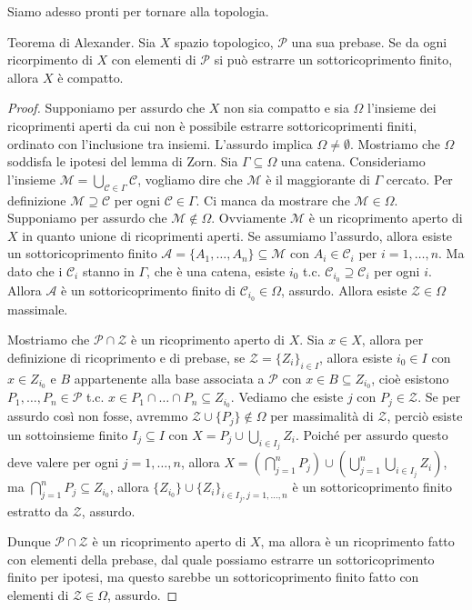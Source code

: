 Siamo adesso pronti per tornare alla topologia.

\begin{thm} \label{alexander}
  Teorema di Alexander. Sia $X$ spazio topologico, $\mathcal{P}$ una sua prebase. Se da ogni ricorpimento di $X$ con elementi di $\mathcal{P}$ si può estrarre un sottoricoprimento finito, allora $X$ è compatto.
\end{thm}

\begin{proof}
  Supponiamo per assurdo che $X$ non sia compatto e sia $\Omega$ l'insieme dei ricoprimenti aperti da cui non è possibile estrarre sottoricoprimenti finiti, ordinato con l'inclusione tra insiemi. L'assurdo implica $\Omega \not= \emptyset$. Mostriamo che $\Omega$ soddisfa le ipotesi del lemma di Zorn.
  Sia $\Gamma \subseteq \Omega$ una catena.
  Consideriamo l'insieme $\displaystyle \mathcal{M}=\bigcup_{\mathcal{C} \in \Gamma} \mathcal{C}$, vogliamo dire che $\mathcal{M}$ è il maggiorante di $\Gamma$ cercato. Per definizione $\mathcal{M} \supseteq \mathcal{C}$ per ogni $\mathcal{C} \in \Gamma$. Ci manca da mostrare che $\mathcal{M} \in \Omega$.
  Supponiamo per assurdo che $\mathcal{M} \not\in \Omega$. Ovviamente $\mathcal{M}$ è un ricoprimento aperto di $X$ in quanto unione di ricoprimenti aperti. Se assumiamo l'assurdo, allora esiste un sottoricoprimento finito $\mathcal{A}=\{A_1, \dots, A_n\} \subseteq \mathcal{M}$ con $A_i \in \mathcal{C}_i$ per $i=1, \dots, n$.
  Ma dato che i $\mathcal{C}_i$ stanno in $\Gamma$, che è una catena, esiste $i_0$ t.c. $\mathcal{C}_{i_0} \supseteq \mathcal{C}_i$ per ogni $i$. Allora $\mathcal{A}$ è un sottoricoprimento finito di $\mathcal{C}_{i_0} \in \Omega$, assurdo. Allora esiste $\mathcal{Z} \in \Omega$ massimale.

  Mostriamo che $\mathcal{P} \cap \mathcal{Z}$ è un ricoprimento aperto di $X$. Sia $x \in X$, allora per definizione di ricoprimento e di prebase, se $\mathcal{Z}=\{Z_i\}_{i \in I}$, allora esiste $i_0 \in I$ con $x \in Z_{i_0}$ e $B$ appartenente alla base associata a $\mathcal{P}$ con $x \in B \subseteq Z_{i_0}$,
  cioè esistono $P_1, \dots, P_n \in \mathcal{P}$ t.c. $x \in P_1 \cap \dots \cap P_n \subseteq Z_{i_0}$. Vediamo che esiste $j$ con $P_j \in \mathcal{Z}$. Se per assurdo così non fosse, avremmo $\mathcal{Z} \cup \{P_j\} \not\in \Omega$ per massimalità di $\mathcal{Z}$,
  perciò esiste un sottoinsieme finito $I_j \subseteq I$ con $\displaystyle X=P_j \cup \bigcup_{i \in I_j} Z_i$. Poiché per assurdo questo deve valere per ogni $j=1, \dots, n$, allora $\displaystyle X=\left(\bigcap_{j=1}^n P_j\right) \cup \left(\bigcup_{j=1}^n \bigcup_{i \in I_j} Z_i\right)$,
  ma $\displaystyle \bigcap_{j=1}^n P_j \subseteq Z_{i_0}$, allora $\{Z_{i_0}\} \cup \{Z_i\}_{i \in I_j, j=1, \dots, n}$ è un sottoricoprimento finito estratto da $\mathcal{Z}$, assurdo.

  Dunque $\mathcal{P} \cap \mathcal{Z}$ è un ricoprimento aperto di $X$, ma allora è un ricoprimento fatto con elementi della prebase, dal quale possiamo estrarre un sottoricoprimento finito per ipotesi, ma questo sarebbe un sottoricoprimento finito fatto con elementi di $\mathcal{Z} \in \Omega$, assurdo.
\end{proof}

